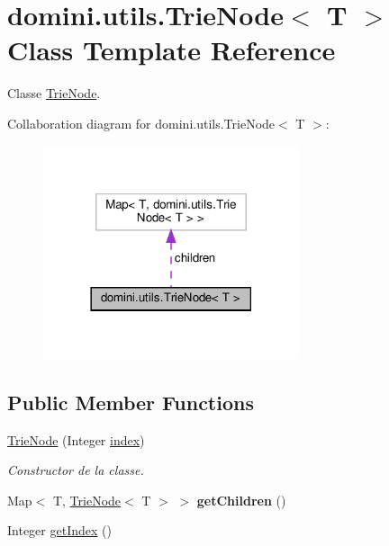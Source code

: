 \hypertarget{classdomini_1_1utils_1_1TrieNode}{}\section{domini.\+utils.\+Trie\+Node$<$ T $>$ Class Template Reference}
\label{classdomini_1_1utils_1_1TrieNode}


Classe \hyperlink{classdomini_1_1utils_1_1TrieNode}{Trie\+Node}.  




Collaboration diagram for domini.\+utils.\+Trie\+Node$<$ T $>$\+:\nopagebreak
\begin{figure}[H]
\begin{center}
\leavevmode
\includegraphics[width=213pt]{classdomini_1_1utils_1_1TrieNode__coll__graph}
\end{center}
\end{figure}
\subsection*{Public Member Functions}
\begin{DoxyCompactItemize}
\item 
\hyperlink{classdomini_1_1utils_1_1TrieNode_af9a18353151b5e3dea5966f50629319a}{Trie\+Node} (Integer \hyperlink{classdomini_1_1utils_1_1TrieNode_a9c247bc6568131e5e6ad0758adb67bfa}{index})
\begin{DoxyCompactList}\small\item\em Constructor de la classe. \end{DoxyCompactList}\item 
\mbox{\label{classdomini_1_1utils_1_1TrieNode_ace4e12a6dd51d77d6d24447eca520478}} 
Map$<$ T, \hyperlink{classdomini_1_1utils_1_1TrieNode}{Trie\+Node}$<$ T $>$ $>$ {\bfseries get\+Children} ()
\item 
Integer \hyperlink{classdomini_1_1utils_1_1TrieNode_ac8e79df6ce5e7b33c6d08a0fe0681916}{get\+Index} ()
\end{DoxyCompactItemize}
